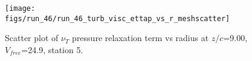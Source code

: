 \begin{figure}[H]
\centering
\texttt{[image: figs/run\_46/run\_46\_turb\_visc\_ettap\_vs\_r\_meshscatter]}
\caption{Scatter plot of $\nu_T$ pressure relaxation term vs radius at $z/c$=9.00, $V_{free}$=24.9, station 5.}
\label{fig:run_46_turb_visc_ettap_vs_r_meshscatter}
\end{figure}


